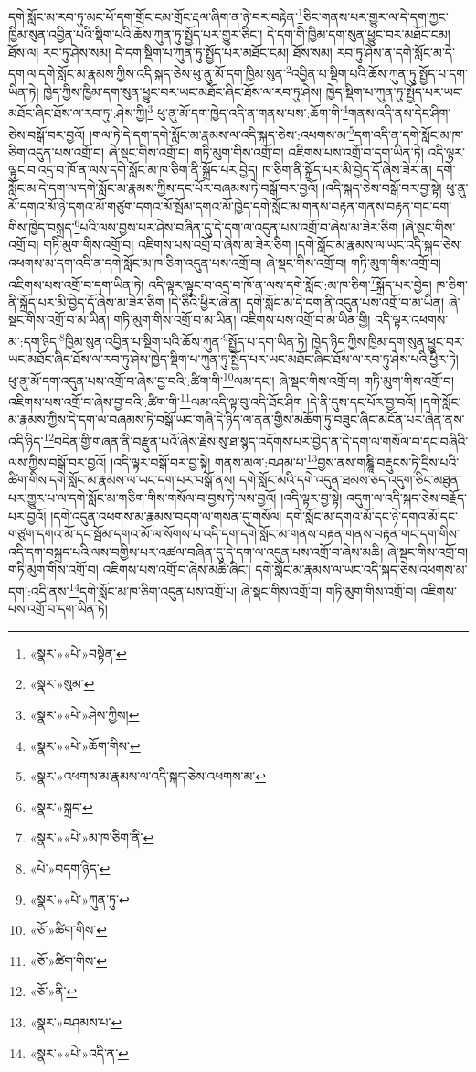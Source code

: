 དགེ་སློང་མ་རབ་ཏུ་མང་པོ་དག་གྲོང་ངམ་གྲོང་རྡལ་ཞིག་ན་ཉེ་བར་བརྟེན་\footnote{«སྣར་»«པེ་»བསྟེན་}ཅིང་གནས་པར་གྱུར་ལ་དེ་དག་ཀྱང་ཁྱིམ་སུན་འབྱིན་པའི་སྡིག་པའི་ཆོས་ཀུན་ཏུ་སྤྱོད་པར་གྱུར་ཅིང་། དེ་དག་གི་ཁྱིམ་དག་སུན་ཕྱུང་བར་མཐོང་ངམ། ཐོས་ལ། རབ་ཏུ་ཤེས་སམ། དེ་དག་སྡིག་པ་ཀུན་ཏུ་སྤྱོད་པར་མཐོང་ངམ། ཐོས་སམ། རབ་ཏུ་ཤེས་ན་དགེ་སློང་མ་དེ་དག་ལ་དགེ་སློང་མ་རྣམས་ཀྱིས་འདི་སྐད་ཅེས་ཕུ་ནུ་མོ་དག་ཁྱིམ་སུན་\footnote{«སྣར་»སུམ་}འབྱིན་པ་སྡིག་པའི་ཆོས་ཀུན་ཏུ་སྤྱོད་པ་དག་ཡིན་ཏེ། ཁྱེད་ཀྱིས་ཁྱིམ་དག་སུན་ཕྱུང་བར་ཡང་མཐོང་ཞིང་ཐོས་ལ་རབ་ཏུ་ཤེས། ཁྱེད་སྡིག་པ་ཀུན་ཏུ་སྤྱོད་པར་ཡང་མཐོང་ཞིང་ཐོས་ལ་རབ་ཏུ་:ཤེས་ཀྱི།\footnote{«སྣར་»«པེ་»ཤེས་ཀྱིས།} ཕུ་ནུ་མོ་དག་ཁྱེད་འདི་ན་གནས་པས་:ཆོག་གི་\footnote{«སྣར་»«པེ་»ཆོག་གིས་}གནས་འདི་ནས་དེང་ཤིག་ཅེས་བསྒོ་བར་བྱའོ། །གལ་ཏེ་དེ་དག་དགེ་སློང་མ་རྣམས་ལ་འདི་སྐད་ཅེས་:འཕགས་མ་\footnote{«སྣར་»འཕགས་མ་རྣམས་ལ་འདི་སྐད་ཅེས་འཕགས་མ་}དག་འདི་ན་དགེ་སློང་མ་ཁ་ཅིག་འདུན་པས་འགྲོ་བ། ཞེ་སྡང་གིས་འགྲོ་བ། གཏི་མུག་གིས་འགྲོ་བ། འཇིགས་པས་འགྲོ་བ་དག་ཡིན་ཏེ། འདི་ལྟར་ལྟུང་བ་འདྲ་བ་ཁོ་ན་ལས་དགེ་སློང་མ་ཁ་ཅིག་ནི་སྐྲོད་པར་བྱེད། ཁ་ཅིག་ནི་སྐྲོད་པར་མི་བྱེད་དོ་ཞེས་ཟེར་ན། དགེ་སློང་མ་དེ་དག་ལ་དགེ་སློང་མ་རྣམས་ཀྱིས་དང་པོར་བཞམས་ཏེ་བསྒོ་བར་བྱའོ། །འདི་སྐད་ཅེས་བསྒོ་བར་བྱ་སྟེ། ཕུ་ནུ་མོ་དགའ་མོ་ཉེ་དགའ་མོ་གཙུག་དགའ་མོ་སྦོམ་དགའ་མོ་ཁྱེད་དགེ་སློང་མ་གནས་བརྟན་གནས་བརྟན་གང་དག་གིས་ཁྱེད་བསྐྲད་\footnote{«སྣར་»སྐྲད་}པའི་ལས་བྱས་པར་ཤེས་བཞིན་དུ་དེ་དག་ལ་འདུན་པས་འགྲོ་བ་ཞེས་མ་ཟེར་ཅིག །ཞེ་སྡང་གིས་འགྲོ་བ། གཏི་མུག་གིས་འགྲོ་བ། འཇིགས་པས་འགྲོ་བ་ཞེས་མ་ཟེར་ཅིག །དགེ་སློང་མ་རྣམས་ལ་ཡང་འདི་སྐད་ཅེས་འཕགས་མ་དག་འདི་ན་དགེ་སློང་མ་ཁ་ཅིག་འདུན་པས་འགྲོ་བ། ཞེ་སྡང་གིས་འགྲོ་བ། གཏི་མུག་གིས་འགྲོ་བ། འཇིགས་པས་འགྲོ་བ་དག་ཡིན་ཏེ། འདི་ལྟར་ལྟུང་བ་འདྲ་བ་ཁོ་ན་ལས་དགེ་སློང་:མ་ཁ་ཅིག་\footnote{«སྣར་»«པེ་»མ་ཁ་ཅིག་ནི་}སྐྲོད་པར་བྱེད། ཁ་ཅིག་ནི་སྐྲོད་པར་མི་བྱེད་དོ་ཞེས་མ་ཟེར་ཅིག །དེ་ཅིའི་ཕྱིར་ཞེ་ན། དགེ་སློང་མ་དེ་དག་ནི་འདུན་པས་འགྲོ་བ་མ་ཡིན། ཞེ་སྡང་གིས་འགྲོ་བ་མ་ཡིན། གཏི་མུག་གིས་འགྲོ་བ་མ་ཡིན། འཇིགས་པས་འགྲོ་བ་མ་ཡིན་གྱི། འདི་ལྟར་འཕགས་མ་:དག་ཉིད་\footnote{«པེ་»བདག་ཉིད་}ཁྱིམ་སུན་འབྱིན་པ་སྡིག་པའི་ཆོས་ཀུན་\footnote{«སྣར་»«པེ་»ཀུན་ཏུ་}སྤྱོད་པ་དག་ཡིན་ཏེ། ཁྱེད་ཉིད་ཀྱིས་ཁྱིམ་དག་སུན་ཕྱུང་བར་ཡང་མཐོང་ཞིང་ཐོས་ལ་རབ་ཏུ་ཤེས་ཁྱེད་སྡིག་པ་ཀུན་ཏུ་སྤྱོད་པར་ཡང་མཐོང་ཞིང་ཐོས་ལ་རབ་ཏུ་ཤེས་པའི་ཕྱིར་ཏེ། ཕུ་ནུ་མོ་དག་འདུན་པས་འགྲོ་བ་ཞེས་བྱ་བའི་:ཚིག་གི་\footnote{«ཅོ་»ཚིག་གིས་}ལམ་དང་། ཞེ་སྡང་གིས་འགྲོ་བ། གཏི་མུག་གིས་འགྲོ་བ། འཇིགས་པས་འགྲོ་བ་ཞེས་བྱ་བའི་:ཚིག་གི་\footnote{«ཅོ་»ཚིག་གིས་}ལམ་འདི་ལྟ་བུ་འདི་ཐོང་ཤིག །དེ་ནི་དུས་དང་པོར་བྱ་བའོ། །དགེ་སློང་མ་རྣམས་ཀྱིས་དེ་དག་ལ་བཞམས་ཏེ་བསྒོ་ཡང་གཞི་དེ་ཉིད་ལ་ནན་གྱིས་མཆོག་ཏུ་བཟུང་ཞིང་མངོན་པར་ཞེན་ནས་འདི་ཉིད་\footnote{«ཅོ་»ནི་}བདེན་གྱི་གཞན་ནི་བརྫུན་པའོ་ཞེས་རྗེས་སུ་ཐ་སྙད་འདོགས་པར་བྱེད་ན་དེ་དག་ལ་གསོལ་བ་དང་བཞིའི་ལས་ཀྱིས་བསྒོ་བར་བྱའོ། །འདི་ལྟར་བསྒོ་བར་བྱ་སྟེ། གནས་མལ་:བཤམ་པ་\footnote{«སྣར་»བཤམས་པ་}བྱས་ནས་གཎྜཱི་བརྡུངས་ཏེ་དྲིས་པའི་ཚིག་གིས་དགེ་སློང་མ་རྣམས་ལ་ཡང་དག་པར་བསྒོ་ནས། དགེ་སློང་མའི་དགེ་འདུན་ཐམས་ཅད་འདུག་ཅིང་མཐུན་པར་གྱུར་པ་ལ་དགེ་སློང་མ་གཅིག་གིས་གསོལ་བ་བྱས་ཏེ་ལས་བྱའོ། །འདི་ལྟར་བྱ་སྟེ། འདུག་ལ་འདི་སྐད་ཅེས་བརྗོད་པར་བྱའོ། །དགེ་འདུན་འཕགས་མ་རྣམས་བདག་ལ་གསན་དུ་གསོལ། དགེ་སློང་མ་དགའ་མོ་དང་ཉེ་དགའ་མོ་དང་གཙུག་དགའ་མོ་དང་སྦོམ་དགའ་མོ་ལ་སོགས་པ་འདི་དག་དགེ་སློང་མ་གནས་བརྟན་གནས་བརྟན་གང་དག་གིས་འདི་དག་བསྐྲད་པའི་ལས་བགྱིས་པར་འཚལ་བཞིན་དུ་དེ་དག་ལ་འདུན་པས་འགྲོ་བ་ཞེས་མཆི། ཞེ་སྡང་གིས་འགྲོ་བ། གཏི་མུག་གིས་འགྲོ་བ། འཇིགས་པས་འགྲོ་བ་ཞེས་མཆི་ཞིང་། དགེ་སློང་མ་རྣམས་ལ་ཡང་འདི་སྐད་ཅེས་འཕགས་མ་དག་:འདི་ནས་\footnote{«སྣར་»«པེ་»འདི་ན་}དགེ་སློང་མ་ཁ་ཅིག་འདུན་པས་འགྲོ་པ། ཞེ་སྡང་གིས་འགྲོ་བ། གཏི་མུག་གིས་འགྲོ་བ། འཇིགས་པས་འགྲོ་བ་དག་ཡིན་ཏེ། 